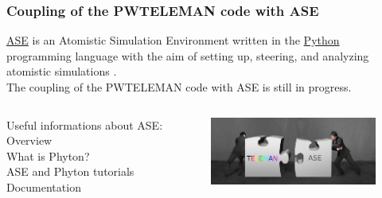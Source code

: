 \documentclass[10pt]{beamer}
\begin{document}
\begin{frame}
\frametitle{Coupling of the PWTELEMAN code with ASE}

\begin{block}{}
   \href{https://wiki.fysik.dtu.dk/ase/overview.html}{ASE} is an Atomistic Simulation Environment written in the \href{http://www.python.org/}{Python} programming language with the aim of setting up, steering, and analyzing atomistic simulations .\\
    The coupling of the PWTELEMAN code with ASE  is still in progress.
   \end{block}
   \vspace*{1.2cm}

\begin{columns}
  \begin{column}{0.5\textwidth}
  Useful informations about ASE:\\
     \vspace*{0.2cm}
Overview \href{https://wiki.fysik.dtu.dk/ase/overview.html}{}\\
What is Phyton? \href{https://wiki.fysik.dtu.dk/ase/python.html#python-info}{}\\
ASE and Phyton tutorials \href{https://wiki.fysik.dtu.dk/ase/tutorials/tutorials.html}{}\\
Documentation \href{https://wiki.fysik.dtu.dk/ase/ase/ase.html}{}\\
  \end{column}
  \begin{column}{0.5\textwidth}
  \centering
 \includegraphics[width=5.5cm]{fig/co}   
  \end{column}
\end{columns}

\end{frame}


\end{document}
